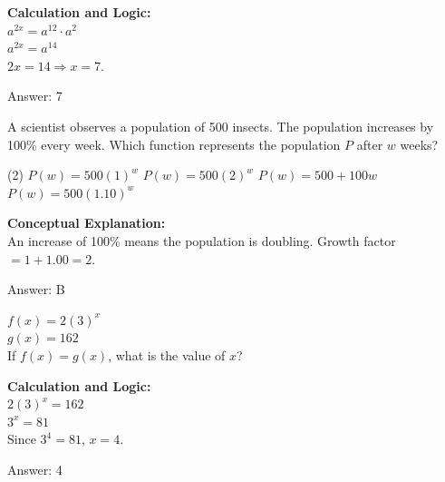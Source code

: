 \documentclass[11pt,paper=a4,answers]{exam}
\begin{document}
\begin{questions}
\begin{solution}
\textbf{Calculation and Logic:} \\
$a^{2x} = a^{12} \cdot a^2$ \\
$a^{2x} = a^{14}$ \\
$2x = 14 \Rightarrow x = 7$.

\vspace{25pt}

Answer: \colorbox{yellow!100}{7}
\end{solution}

\vspace{40pt}

\question
A scientist observes a population of 500 insects. The population increases by 100\% every week. Which function represents the population $P$ after $w$ weeks?
\begin{tasks}(2)
    \task $P(w) = 500(1)^w$
    \task $P(w) = 500(2)^w$
    \task $P(w) = 500 + 100w$
    \task $P(w) = 500(1.10)^w$
\end{tasks}

\begin{solution}
\textbf{Conceptual Explanation:} \\
An increase of 100\% means the population is doubling. Growth factor $= 1 + 1.00 = 2$.

\vspace{25pt}

Answer: \colorbox{yellow!100}{B}
\end{solution}

\vspace{40pt}

\question
$f(x) = 2(3)^x$ \\
$g(x) = 162$ \\
If $f(x) = g(x)$, what is the value of $x$?

\begin{solution}
\textbf{Calculation and Logic:} \\
$2(3)^x = 162$ \\
$3^x = 81$ \\
Since $3^4 = 81$, $x = 4$.

\vspace{25pt}

Answer: \colorbox{yellow!100}{4}
\end{solution}

\vspace{40pt}


\end{questions}
\end{document}
